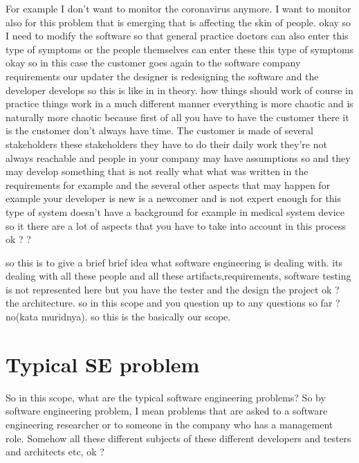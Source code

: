 \documentclass[conference, compsoc, twoside]{IEEEtran}
\begin{document}
For example I don't want to monitor the coronavirus anymore. 
 I want to monitor also for this problem that is emerging that is affecting the skin of people.
 okay 
so I need to modify the software so that general practice doctors can also enter this type of symptoms or the people themselves can enter these this type of symptoms okay so in this case the customer goes again to the software company requirements our updater the designer is redesigning the software and the developer develops so this is like in in theory. how things should work of course in practice things work in a much different manner everything is more chaotic and is naturally more chaotic because first of all you have to have the customer there it is the customer don't always have time.
 The customer is made of several stakeholders these stakeholders they have to do their daily work they're not always reachable and people in your company may have assumptions so and they may develop something that is not really what what was written in the requirements 
for example and the several other aspects that may happen 
for example your developer is new is a newcomer and is not expert enough for this type of system doesn't have a background 
for example in medical system device so it there are a lot of aspects that you have to take into account in this process ok ? ?

 so this is to give a brief brief idea what software engineering is dealing with.
 its dealing with all these people and all these artifacts,requirements, software testing is not represented here but you have the tester and the design the project ok ? the architecture.
 so in this scope and you question up to any questions so far ?
 no(kata muridnya). 
 so this is the basically our scope.
 
\section{Typical SE problem} %


So in this scope, what are the typical software engineering problems?
So by software engineering problem, I mean problems that are asked to a software engineering researcher or to someone in the company who has a management role. 
Somehow all these different subjects of these different developers and testers and architects etc, ok ? 
\end{document}

